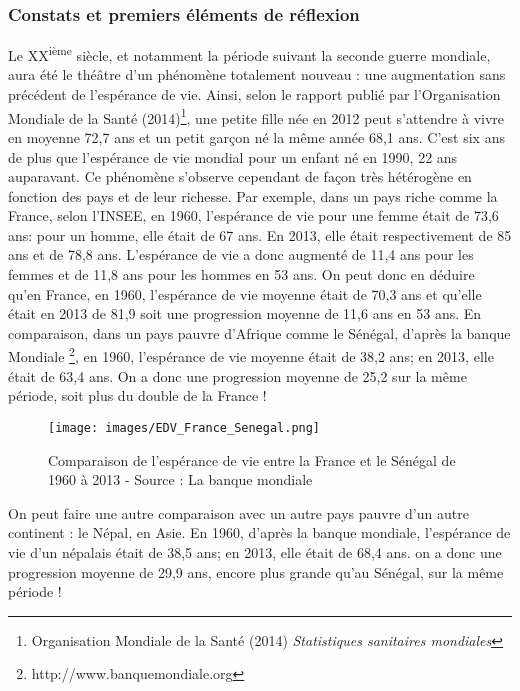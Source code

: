 \subsubsection*{Constats et premiers éléments de réflexion}
Le XX\textsuperscript{ième} siècle, et notamment la période suivant la seconde guerre mondiale, aura été le théâtre d'un phénomène totalement nouveau : une augmentation sans précédent de l'espérance de vie. Ainsi, selon le rapport publié par l'Organisation Mondiale de la Santé (2014)\footnote{Organisation Mondiale de la Santé (2014) \textit{Statistiques sanitaires mondiales}}, une petite fille née en 2012 peut s'attendre à vivre en moyenne 72,7 ans et un petit garçon né la même année 68,1 ans. C'est six ans de plus que l'espérance de vie mondial pour un enfant né en 1990, 22 ans auparavant. 
Ce phénomène s'observe cependant de façon très hétérogène en fonction des pays et de leur richesse. Par exemple, dans un pays riche comme la France,  selon l'INSEE, en 1960, l'espérance de vie pour une femme était de 73,6 ans: pour un homme, elle était de 67 ans. En 2013, elle était respectivement de 85 ans et de 78,8 ans. L'espérance de vie a donc augmenté de 11,4 ans pour les femmes et de 11,8 ans pour les hommes en 53 ans. On peut donc en déduire qu'en France, en 1960, l'espérance de vie moyenne était de 70,3 ans et qu'elle était en 2013 de 81,9 soit une progression moyenne de 11,6 ans en 53 ans.
En comparaison, dans un pays pauvre d'Afrique comme le Sénégal, d'après la banque Mondiale \footnote{http://www.banquemondiale.org}, en 1960, l'espérance de vie moyenne était de 38,2 ans; en 2013, elle était de 63,4 ans. On a donc une progression moyenne de 25,2 sur la même période, soit plus du double de la France !

\begin{figure}[htbp]%
\begin{center}
\texttt{[image: images/EDV\_France\_Senegal.png]} 
\end{center}
\caption{Comparaison de l'espérance de vie entre la France et le Sénégal de 1960 à 2013 - Source : La banque mondiale}
\label{Comparaison de l'espérance de vie entre la France et le Sénégal de 1960 à 2013 - Source : La banque mondiale} 
\end{figure}

On peut faire une autre comparaison avec un autre pays pauvre d'un autre continent : le Népal, en Asie. En 1960, d'après la banque mondiale, l'espérance de vie d'un népalais était de 38,5 ans; en 2013, elle était de 68,4 ans. on a donc une progression moyenne de 29,9 ans, encore plus grande qu'au Sénégal, sur la même période !

